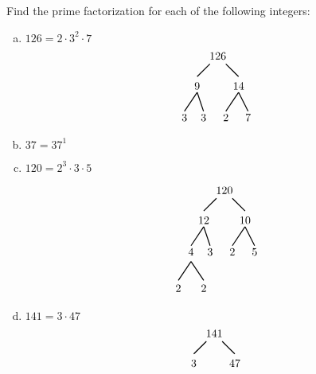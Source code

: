 \documentclass[12pt,letterpaper]{exam}
\begin{document}
\begin{questions}
\newpage



\question[8] Find the prime factorization for each of the following integers: \pspace
        \begin{enumerate}[(a)]
        \item $126=  2 \cdot 3^2 \cdot 7$ \pspace
        	\[
	\begin{tikzpicture}
	\node at (-0.15,0.15) {$126$};
	\draw[line width=0.03cm] (-0.4,-0.1) -- (-0.8,-0.5);
	\node at (-0.8,-0.8) {$9$};
	\draw[line width=0.03cm]  (0.1,-0.1) -- (0.5,-0.5);
	\node at (0.5,-0.8) {$14$};
		
	\draw[line width=0.03cm] (-0.8,-1) -- (-1.2,-1.6);
	\node at (-1.2,-1.8) {$3$};
	\draw[line width=0.03cm] (-0.8,-1) -- (-0.6,-1.6);
	\node at (-0.6,-1.8) {$3$};
	
	\draw[line width=0.03cm] (0.5,-1) -- (0.1,-1.6);
	\node at (0.1,-1.8) {$2$};
	\draw[line width=0.03cm] (0.5,-1) -- (0.8,-1.6);
	\node at (0.8,-1.8) {$7$};
	\end{tikzpicture}
	\] \pvspace{0.9cm}
	
        \item $37= 37^1$ \vfill
        \item $120= 2^3 \cdot 3 \cdot 5$ 
        
        	\[
	\begin{tikzpicture}
	\node at (-0.15,0.15) {$120$};
	\draw[line width=0.03cm] (-0.4,-0.1) -- (-0.8,-0.5);
	\node at (-0.8,-0.8) {$12$};
	\draw[line width=0.03cm]  (0.1,-0.1) -- (0.5,-0.5);
	\node at (0.5,-0.8) {$10$};
		
	\draw[line width=0.03cm] (-0.8,-1) -- (-1.2,-1.6);
	\node at (-1.2,-1.8) {$4$};
		\draw[line width=0.03cm] (-1.2,-2.1) -- (-1.6, -2.7);
		\draw[line width=0.03cm] (-1.2,-2.1) -- (-0.8,-2.7);
		\node at (-1.6,-2.95) {$2$};
		\node at (-0.8,-2.95) {$2$};
	\draw[line width=0.03cm] (-0.8,-1) -- (-0.6,-1.6);
	\node at (-0.6,-1.8) {$3$};
	
	\draw[line width=0.03cm] (0.5,-1) -- (0.1,-1.6);
	\node at (0.1,-1.8) {$2$};
	\draw[line width=0.03cm] (0.5,-1) -- (0.8,-1.6);
	\node at (0.8,-1.8) {$5$};
	\end{tikzpicture}
	\] \pvspace{0.1cm}
	
        \item $141=  3 \cdot 47$ 
	\[
	\begin{tikzpicture}
	\node at (-0.15,0.15) {$141$};
	\draw[line width=0.03cm] (-0.4,-0.1) -- (-0.8,-0.5);
	\node at (-0.8,-0.8) {$3$};
	\draw[line width=0.03cm]  (0.1,-0.1) -- (0.5,-0.5);
	\node at (0.5,-0.8) {$47$};
	\end{tikzpicture}
	\] \pvspace{2.9cm}
        \end{enumerate}




\end{questions}
\end{document}

